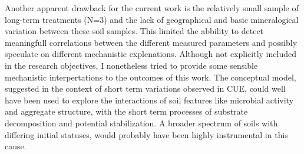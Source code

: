 Another apparent drawback for the current work is the relatively small sample of long-term treatments (N=3) and the lack of geographical and basic mineralogical variation between these soil samples. This limited the abbility to detect meaningfull correlations between the different measured parameters and possibly speculate on different mechanistic explenations. Although not explicitly included in the research objectives, I nonetheless tried to provide some sensible mechanistic interpertations to the outcomes of this work. The conceptual model, suggested in the context of short term variations observed in CUE, could well have been used to explore the interactions of soil features like microbial activity and aggregate structure, with the short term processes of substrate decomposition and potential stabilization. A broader spectrum of soils with differing initial statuses, would probably have been highly instrumental in this cause. 
